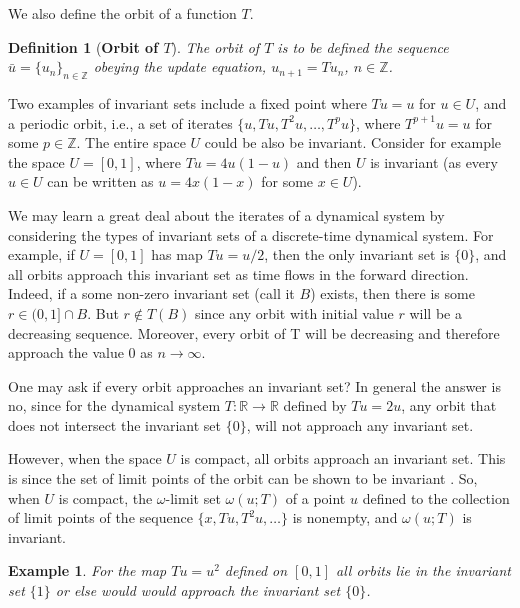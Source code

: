 \documentclass[a4paper,12pt,twoside]{report}
\newtheorem{Definition}{Definition}[]
\newtheorem{Example}{Example}[]
\begin{document}
We also define the orbit of a function $T$.
\begin{Definition}
  [\bf Orbit of $T$]\label{Dfn_Orbit}\rm
  The orbit of $T$ is to be defined the sequence $\bar{u} = \{u_n\}_{n\in \mathbb{Z}}$ obeying the update equation, $u_{n+1}=Tu_n$, $n \in \mathbb{Z}$. 
\end{Definition}

Two examples of invariant sets include a fixed point where $Tu=u$ for  $u\in U$, and a periodic orbit, i.e., a set of iterates $\{u,Tu, T^2u,\ldots,T^pu\}$, where $T^{p+1}u=u$ for some $p\in\mathbb{Z}$.  The entire space $U$ could be also be invariant.
Consider for example the space $U=[0,1]$, where $Tu=4u(1-u)$ and then $U$ is invariant (as every $u\in{U}$ can be written as $u = 4x(1-x)$ for some $x\in{U}$).

We may learn a great deal about the iterates of a dynamical system by considering the types of invariant sets of a discrete-time dynamical system.  For example, if $U=[0,1]$ has map $Tu= u/2$, then the only invariant set is $\{0\}$, and all orbits approach this invariant set as time flows in the forward direction. 
Indeed, if a some non-zero invariant set (call it $B$) exists, then there is  some $r\in(0,1]\cap{B}$. But $r\notin{T(B)}$ since any orbit with initial value $r$ will be a decreasing sequence. Moreover, every orbit of T will be decreasing and therefore approach the value $0$ as $n\rightarrow\infty$.

One may ask if every orbit approaches an invariant set? In general the answer is no, since for the dynamical system $T: \mathbb{R} \to \mathbb{R}$ defined by $Tu=2u$, any orbit that does not intersect the invariant set $\{0\}$, will not approach any invariant set. 

However,  when the space $U$ is compact, all orbits approach an invariant set. This is since the set of limit points of the orbit can be shown to be invariant \cite{de2013elements}. So, when $U$ is compact,  the $\omega$-limit set $\omega(u;T)$ of a point $u$ defined to the collection of limit points of the sequence $\{x,Tu,T^2u,\ldots\}$ is nonempty, and $\omega(u;T)$ is invariant. 

\begin{Example}
  For the map $Tu=u^2$ defined on $[0,1]$ all orbits lie in the invariant set $\{1\}$ or else would would approach the invariant set $\{0\}$. 
\end{Example}
\end{document}
